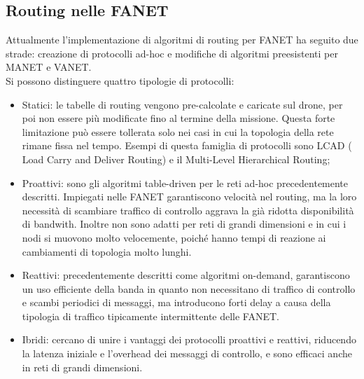 \subsection[Routing nelle FANET]{Routing nelle FANET}
Attualmente l'implementazione di algoritmi di routing per FANET ha seguito due strade: creazione di protocolli ad-hoc e modifiche di algoritmi preesistenti per MANET e VANET. \\
Si possono distinguere quattro tipologie di protocolli:
\begin{itemize}
	\item Statici: le tabelle di routing vengono pre-calcolate e caricate sul drone, per poi non essere più modificate fino al termine della missione. Questa forte limitazione può essere tollerata solo nei casi in cui la topologia della rete rimane fissa nel tempo. Esempi di questa famiglia di protocolli sono LCAD ( Load Carry and Deliver Routing) e il Multi-Level Hierarchical Routing;
	\item Proattivi: sono gli algoritmi table-driven per le reti ad-hoc precedentemente descritti. Impiegati nelle FANET garantiscono velocità nel routing, ma la loro necessità di scambiare traffico di controllo aggrava la già ridotta disponibilità di bandwith. Inoltre non sono adatti per reti di grandi dimensioni e in cui i nodi si muovono molto velocemente, poiché hanno tempi di reazione ai cambiamenti di topologia molto lunghi.
	\item Reattivi: precedentemente descritti come algoritmi on-demand, garantiscono un uso efficiente della banda in quanto non necessitano di traffico di controllo e scambi periodici di messaggi, ma introducono forti delay a causa della tipologia di traffico tipicamente intermittente delle FANET. 
	\item Ibridi: cercano di unire i vantaggi dei protocolli proattivi e reattivi, riducendo la latenza iniziale e l'overhead dei messaggi di controllo, e sono efficaci anche in reti di grandi dimensioni. 
\end{itemize}






